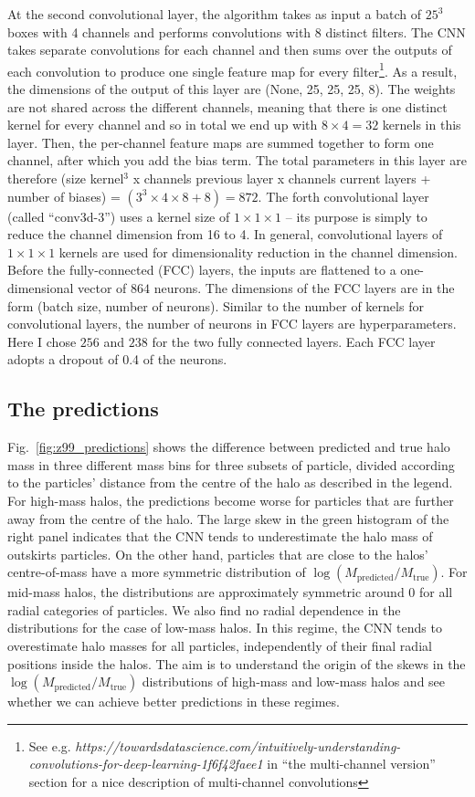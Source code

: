 \documentclass[11pt]{article}
\begin{document}
At the second convolutional layer, the algorithm takes as input a batch of $25^3$ boxes with 4 channels and performs convolutions with 8 distinct filters. The CNN takes separate convolutions for each channel and then sums over the outputs of each convolution to produce one single feature map for every filter\footnote{See e.g. \textit{https://towardsdatascience.com/intuitively-understanding-convolutions-for-deep-learning-1f6f42faee1} in “the multi-channel version” section for a nice description of multi-channel convolutions}. As a result, the dimensions of the output of this layer are (None, 25, 25, 25, 8). The weights are not shared across the different channels, meaning that there is one distinct kernel for every channel and so in total we end up with $8\times4 = 32$ kernels in this layer. Then, the per-channel feature maps are summed together to form one channel, after which you add the bias term. The total parameters in this layer are therefore
(size kernel$^3$ x channels previous layer x channels current layers + number of biases) =  $(3^3 \times 4 \times 8 + 8) = 872$.
The forth convolutional layer (called ``conv3d-3'') uses a kernel size of $1\times1\times1$ -- its purpose is simply to reduce the channel dimension from 16 to 4. In general, convolutional layers of $1\times1\times1$ kernels are used for dimensionality reduction in the channel dimension. Before the fully-connected (FCC) layers, the inputs are flattened to a one-dimensional vector of $864$ neurons. The dimensions of the FCC layers are in the form (batch size, number of neurons). Similar to the number of kernels for convolutional layers, the number of neurons in FCC layers are hyperparameters. Here I chose $256$ and $238$ for the two fully connected layers. Each FCC layer adopts a dropout of 0.4 of the neurons.


\subsection{The predictions}

Fig.~\ref{fig:z99_predictions} shows the difference between predicted and true halo mass in three different mass bins for three subsets of particle, divided according to the particles' distance from the centre of the halo as described in the legend. For high-mass halos, the predictions become worse for particles that are further away from the centre of the halo. The large skew in the green histogram of the right panel indicates that the CNN tends to underestimate the halo mass of outskirts particles. On the other hand, particles that are close to the halos' centre-of-mass have a more symmetric distribution of $\log(M_\mathrm{predicted}/M_\mathrm{true})$. For mid-mass halos, the distributions are approximately symmetric around $0$ for all radial categories of particles. We also find no radial dependence in the distributions for the case of low-mass halos. In this regime, the CNN tends to overestimate halo masses for all particles, independently of their final radial positions inside the halos. The aim is to understand the origin of the skews in the $\log(M_\mathrm{predicted}/M_\mathrm{true})$ distributions of high-mass and low-mass halos and see whether we can achieve better predictions in these regimes.
\end{document}
